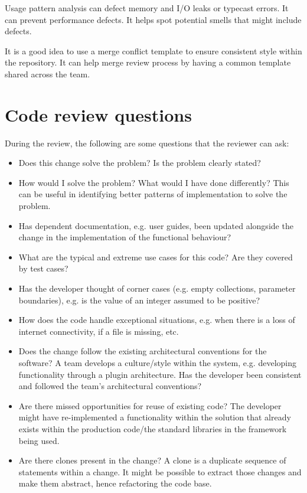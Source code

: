 \documentclass[a4paper, openany]{memoir}
\begin{document}
Usage pattern analysis can defect memory and I/O leaks or typecast errors. It can prevent performance defects. It helps spot potential smells that might include defects. 

It is a good idea to use a merge conflict template to ensure consistent style within the repository. It can help merge review process by having a common template shared across the team.

\section{Code review questions}
During the review, the following are some questions that the reviewer can ask:
\begin{itemize}
    \item Does this change solve the problem? Is the problem clearly stated?
    \item How would I solve the problem? What would I have done differently? This can be useful in identifying better patterns of implementation to solve the problem.
    \item Has dependent documentation, e.g. user guides, been updated alongside the change in the implementation of the functional behaviour?
    \item What are the typical and extreme use cases for this code? Are they covered by test cases?
    \item Has the developer thought of corner cases (e.g. empty collections, parameter boundaries), e.g. is the value of an integer assumed to be positive?
    \item How does the code handle exceptional situations, e.g. when there is a loss of internet connectivity, if a file is missing, etc.
    \item Does the change follow the existing architectural conventions for the software? A team develops a culture/style within the system, e.g. developing functionality through a plugin architecture. Has the developer been consistent and followed the team's architectural conventions?
    \item Are there missed opportunities for reuse of existing code? The developer might have re-implemented a functionality within the solution that already exists within the production code/the standard libraries in the framework being used.
    \item Are there clones present in the change? A clone is a duplicate sequence of statements within a change. It might be possible to extract those changes and make them abstract, hence refactoring the code base.

\end{itemize}
\end{document}
